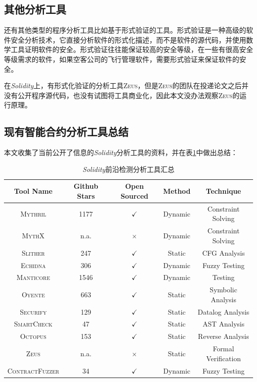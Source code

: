 \subsection{其他分析工具}

还有其他类型的程序分析工具比如基于形式验证的工具。形式验证是一种高级的软件安全分析技术，它直接分析软件的形式化描述，而不是软件的源代码，并使用数学工具证明软件的安全。形式验证往往能保证较高的安全等级，在一些有很高安全等级需求的软件，如果空客公司的飞行管理软件，需要形式验证来保证软件的安全。

在\emph{Solidity}上，有形式化验证的分析工具\textsc{Zeus}，但是\textsc{Zeus}的团队在投递论文之后并没有公开程序源代码，也没有试图将工具商业化，因此本文没办法观察\textsc{Zeus}的运行原理。

\subsection{现有智能合约分析工具总结}

本文收集了当前公开了信息的\emph{Solidity}分析工具的资料，并在表\ref{tab:all_tools}中做出总结：

\begin{table}[h]
    \centering
    \caption{\emph{Solidity}前沿检测分析工具汇总}
    \small
    \begin{tabular}{ccccc}
\toprule
 Tool Name & Github Stars & Open Sourced & Method & Technique \\
 \midrule
 \textsc{Mythril} & 1177 & $\checkmark$ & Dynamic & Constraint Solving \\
 \textsc{MythX} & n.a.& $\times$ & Dynamic & Constraint Solving    \\
 \textsc{Slither} & 247 & $\checkmark$ & Static & CFG Analysis   \\
 \textsc{Echidna} & 306 & $\checkmark$ & Dynamic & Fuzzy Testing  \\
 \textsc{Manticore} & 1546 & $\checkmark$ & Dynamic & Testing  \\
 \textsc{Oyente} & 663 & $\checkmark$ &  Static & Symbolic Analysis   \\
 \textsc{Securify} & 129 & $\checkmark$ &  Static & Datalog Analysis   \\
 \textsc{SmartCheck} & 47 & $\checkmark$ & Static & AST Analysis  \\
 \textsc{Octopus} & 153 & $\checkmark$ & Static & Reverse Analysis  \\
 \textsc{Zeus} & n.a. & $\times$ & Static & Formal Verification   \\
 \textsc{ContractFuzzer} & 34 & $\checkmark$ & Dynamic & Fuzzy Testing  \\
 \bottomrule
\end{tabular}
\label{tab:all_tools}
\end{table}

